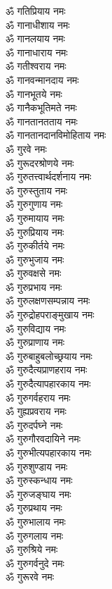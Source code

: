 \begin{multicols}{2}
\begin{flushleft}
ॐ गतिप्रियाय नमः\\
ॐ गानाधीशाय नमः\\
ॐ गानलयाय नमः\hfill{}\\
ॐ गानाधाराय नमः\\
ॐ गतीश्वराय नमः\\
ॐ गानवन्मानदाय नमः\\
ॐ गानभूतये नमः\\
ॐ गानैकभूतिमते नमः\\
ॐ गानतानतताय नमः\\
ॐ गानतानदानविमोहिताय नमः\\
ॐ गुरवे नमः\\
ॐ गुरूदरश्रोणये नमः\\
ॐ गुरुतत्त्वार्थदर्शनाय नमः\hfill{}\\
ॐ गुरुस्तुताय नमः\\
ॐ गुरुगुणाय नमः\\
ॐ गुरुमायाय नमः\\
ॐ गुरुप्रियाय नमः\\
ॐ गुरुकीर्तये नमः\\
ॐ गुरुभुजाय नमः\\
ॐ गुरुवक्षसे नमः\\
ॐ गुरुप्रभाय नमः\\
ॐ गुरुलक्षणसम्पन्नाय नमः\\
ॐ गुरुद्रोहपराङ्मुखाय नमः\hfill{}\\
ॐ गुरुविद्याय नमः\\
ॐ गुरुप्राणाय नमः\\
ॐ गुरुबाहुबलोच्छ्रयाय नमः\\
ॐ गुरुदैत्यप्राणहराय नमः\\
ॐ गुरुदैत्यापहारकाय नमः\\
ॐ गुरुगर्वहराय नमः\\
ॐ गुह्यप्रवराय नमः\\
ॐ गुरुदर्पघ्ने नमः\\
ॐ गुरुगौरवदायिने नमः\\
ॐ गुरुभीत्यपहारकाय नमः\hfill{}\\
ॐ गुरुशुण्डाय नमः\\
ॐ गुरुस्कन्धाय नमः\\
ॐ गुरुजङ्घाय नमः\\
ॐ गुरुप्रथाय नमः\\
ॐ गुरुभालाय नमः\\
ॐ गुरुगलाय नमः\\
ॐ गुरुश्रिये नमः\\
ॐ गुरुगर्वनुदे नमः\\
ॐ गुरूरवे नमः\\

\end{flushleft}
\end{multicols}
